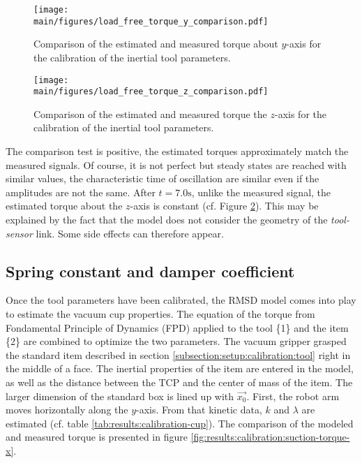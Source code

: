 \documentclass[/home/francois/latex/report/main.tex]{subfiles}
\begin{document}
\begin{figure}[H]
  \centering
  \texttt{[image: \\main/figures/load\_free\_torque\_y\_comparison.pdf]}
  \caption{Comparison of the estimated and measured torque about $y$-axis for the calibration of the inertial tool parameters.}
  \label{fig:results:torque-y}
\end{figure}

\begin{figure}[H]
  \centering
  \texttt{[image: \\main/figures/load\_free\_torque\_z\_comparison.pdf]}
  \caption{Comparison of the estimated and measured torque the $z$-axis for the calibration of the inertial tool parameters.}
  \label{fig:results:torque-z}
\end{figure}

The comparison test is positive, the estimated torques approximately match the measured signals. Of course, it is not perfect but steady states are reached with similar values, the characteristic time of oscillation are similar even if the amplitudes are not the same. After $t = 7.0 \si{\second}$, unlike the measured signal, the estimated torque about the $z$-axis is constant (cf. Figure \ref{fig:results:torque-z}). This may be explained by the fact that the model does not consider the geometry of the \textit{tool-sensor} link. Some side effects can therefore appear.

\subsection{Spring constant and damper coefficient}

Once the tool parameters have been calibrated, the \ac{RMSD} model comes into play to estimate the vacuum cup properties. The equation of the torque from Fondamental Principle of Dynamics (FPD) applied to the tool \{1\} and the item \{2\} are combined to optimize the two parameters. The vacuum gripper grasped the standard item described in section \ref{subsection:setup:calibration:tool} right in the middle of a face. The inertial properties of the item are entered in the model, as well as the distance between the \ac{TCP} and the center of mass of the item. The larger dimension of the standard box is lined up with $\overrightarrow{x_0}$. First, the robot arm moves horizontally along the $y$-axis. From that kinetic data, $k$ and $\lambda$ are estimated (cf. table \ref{tab:results:calibration-cup}). The comparison of the modeled and measured torque is presented in figure \ref{fig:results:calibration:suction-torque-x}.
\end{document}
